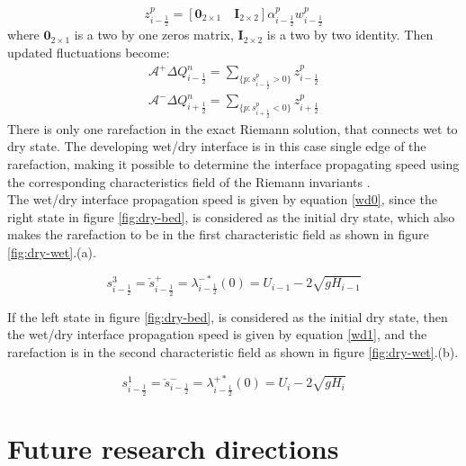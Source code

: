 \documentclass[12pt,a4paper]{article}
\begin{document}
	\begin{equation}
		z_{i-\frac{1}{2}}^{p} = [\mathbf{0}_{2\times1} \quad \mathbf{I}_{2\times2}] \alpha_{i-\frac{1}{2}}^{p} w_{i-\frac{1}{2}}^{p}
	\end{equation}
	where $\mathbf{0}_{2\times1}$ is a two by one zeros matrix, $\mathbf{I}_{2\times2}$ is a two by two identity. Then updated fluctuations become:
	\begin{eqnarray}
		\mathcal{A^{+}}\Delta Q_{i-\frac{1}{2}}^{n} = \sum_{\{ p:s_{i-\frac{1}{2}}^{p}>0\}}  z_{i-\frac{1}{2}}^{p}
		\label{p7}\\
		\mathcal{A^{-}}\Delta Q_{i+\frac{1}{2}}^{n} = \sum_{\{ p:s_{i+\frac{1}{2}}^{p}<0\}} z_{i+\frac{1}{2}}^{p}
		\label{p8}
	\end{eqnarray}
	There is only one rarefaction in the exact Riemann solution, that connects wet to dry state. The developing wet/dry interface is in this case single edge of the rarefaction, making it possible to determine the interface propagating speed using the corresponding characteristics field of the Riemann invariants \cite{ge:2008}.\\ 
	
	\noindent The wet/dry interface propagation  speed  is given by equation \eqref{wd0}, since the right state in figure \ref{fig:dry-bed}, is considered as the initial dry state, which also makes the rarefaction to be in the first characteristic field as shown in figure \ref{fig:dry-wet}.(a).
	
	\begin{equation}
		s_{i-\frac{1}{2}}^{3} = \check{s}_{i-\frac{1}{2}}^{+} = \lambda_{i-\frac{1}{2}}^{-*}(0)= U_{i-1} - 2\sqrt{gH_{i-1}}
		\label{wd0}
	\end{equation}
	
	\noindent If the left state in figure \ref{fig:dry-bed}, is considered as the initial dry state, then the  wet/dry interface propagation  speed  is given by equation \eqref{wd1}, and the  rarefaction is in the second characteristic field  as shown in figure \ref{fig:dry-wet}.(b).
	
	\begin{equation}
		s_{i-\frac{1}{2}}^{1} = \check{s}_{i-\frac{1}{2}}^{-} = \lambda_{i-\frac{1}{2}}^{+*}(0)= U_{i} - 2\sqrt{gH_{i}}
		\label{wd1}
	\end{equation}
	\section{ Future research directions}
	
	
	
	
	
	
	
	
\end{document}
